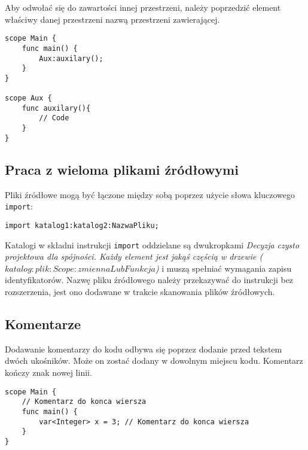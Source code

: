 Aby odwołać się do zawartości innej przestrzeni, należy poprzedzić element właściwy danej przestrzeni nazwą przestrzeni zawierającej.
\begin{lstlisting}
scope Main {
	func main() {
		Aux:auxilary();	
	}
}

scope Aux {
	func auxilary(){
		// Code
	}
}
\end{lstlisting}

\subsection{Praca z wieloma plikami źródłowymi}
Pliki źródłowe mogą być łączone między sobą poprzez użycie słowa kluczowego \lstinline|import|:
\begin{lstlisting}
import katalog1:katalog2:NazwaPliku;
\end{lstlisting}
Katalogi w składni instrukcji \lstinline|import| oddzielane są dwukropkami  \textit{Decyzja czysto projektowa dla spójności. Każdy element jest jakąś częścią w drzewie ($katalog:plik:Scope:zmiennaLubFunkcja$)} i muszą spełniać wymagania zapisu identyfikatorów. Nazwę pliku źródłowego należy przekazywać do instrukcji bez rozszerzenia, jest ono dodawane w trakcie skanowania plików źródłowych. 

\subsection{Komentarze}
Dodawanie komentarzy do kodu odbywa się poprzez dodanie przed tekstem dwóch ukośników. Może on zostać dodany w dowolnym miejscu kodu. Komentarz kończy znak nowej linii.
\begin{lstlisting}
scope Main {
	// Komentarz do konca wiersza
	func main() {
		var<Integer> x = 3; // Komentarz do konca wiersza
	}
}
\end{lstlisting}


